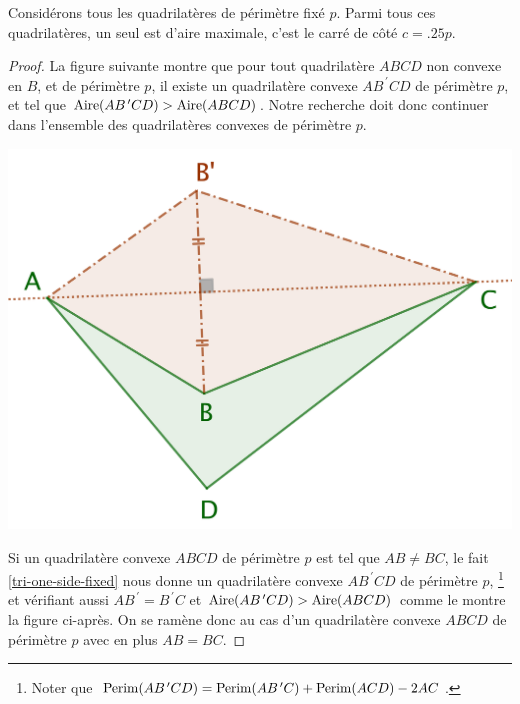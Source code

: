 \begin{fact}
	Considérons tous les quadrilatères de périmètre fixé $p$. Parmi tous ces quadrilatères, un seul est d'aire maximale, c'est le carré de côté $c = \num{.25} p$.
\end{fact}


\begin{proof}
	La figure suivante montre que pour tout quadrilatère $ABCD$ non convexe en $B$, et de périmètre $p$, il existe un quadrilatère convexe $AB^{\,\prime}CD$ de périmètre $p$, et tel que $\mathrm{Aire}(AB^{\,\prime}CD) > \mathrm{Aire}(ABCD)$.
	Notre recherche doit donc continuer dans l'ensemble des quadrilatères convexes de périmètre $p$.

	\begin{center}
		\includegraphics[scale=.4]{content/quadrilateral/quadrilateral-non-convex.png}
	\end{center}
	
	
	Si un quadrilatère convexe $ABCD$ de périmètre $p$ est tel que $AB \neq BC$, le fait \ref{tri-one-side-fixed} nous donne un quadrilatère convexe $AB^{\,\prime}CD$ de périmètre $p$,%
	\footnote{
		Noter que
		$\mathrm{Perim}(AB^{\,\prime}CD) = \mathrm{Perim}(AB^{\,\prime}C) + \mathrm{Perim}(ACD) - 2 AC$.
	}
	et vérifiant aussi $AB^{\,\prime} = B^{\,\prime}C$ et $\mathrm{Aire}(AB^{\,\prime}CD) > \mathrm{Aire}(ABCD)$ comme le montre la figure ci-après.
	On se ramène donc au cas d'un quadrilatère convexe $ABCD$ de périmètre $p$ avec en plus $AB = BC$.


\end{proof}
